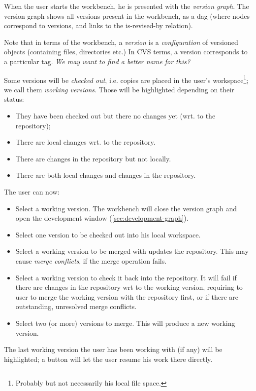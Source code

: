 \documentclass[a4paper]{article}
\begin{document}
When the user starts the workbench, he is presented with the
\emph{version graph}. The version graph shows all versions present in
the workbench, as a dag (where nodes correspond to versions, and links 
to the is-revised-by relation). 

Note that in terms of the workbench, a \emph{version} is a
\emph{configuration} of versioned objects (containing files,
directories etc.) In CVS terms, a version corresponds to a particular
tag. \emph{We may want to find a better name for this?}


Some versions will be \emph{checked out}, i.e. copies are placed in
the user's workspace\footnote{Probably but not necessarily his local
  file space.}; we call them \emph{working versions}. Those will be
highlighted depending on their status:
\begin{itemize}
\item They have been checked out but there no changes yet (wrt. to the
  repository);
\item There are local changes wrt. to the repository.
\item There are changes in the repository but not locally.
\item There are both local changes and changes in the repository.
\end{itemize}

The user can now:
\begin{itemize}
\item Select a working version. The workbench will close the version
  graph and open the development window (\ref{sec:development-graph}).
\item Select one version to be checked out into his local workspace.
\item Select a working version to be merged with updates the
  repository. This may cause \emph{merge conflicts}, if the merge
  operation fails. 
\item Select a working version to check it back into the
  repository. It will fail if there are changes in the repository wrt
  to the working version, requiring to user to merge the working
  version with the repository first, or if there are outstanding,
  unresolved merge conflicts.
\item Select two (or more) versions to merge. This will produce a new
  working version.
\end{itemize}

The last working version the user has been working with (if any) will
be highlighted; a button will let the user resume his work there
directly. 
\end{document}
